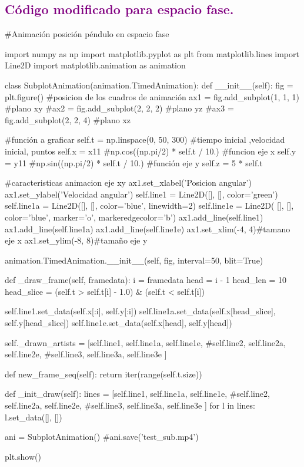 \documentclass[12pt]{article}
\begin{document}
\subsection*{\textcolor{Purple}{Código modificado para espacio fase.}}
\begin{boxedverbatim}
#Animación posición péndulo en espacio fase

import numpy as np
import matplotlib.pyplot as plt
from matplotlib.lines import Line2D
import matplotlib.animation as animation

class SubplotAnimation(animation.TimedAnimation):
    def __init__(self):
        fig = plt.figure()
        #posicion de los cuadros de animación
        ax1 = fig.add_subplot(1, 1, 1) #plano xy
        #ax2 = fig.add_subplot(2, 2, 2) #plano yz
        #ax3 = fig.add_subplot(2, 2, 4) #plano xz

        
        #función a graficar
        self.t = np.linspace(0, 50, 300)
        #tiempo inicial ,velocidad inicial, puntos
        self.x = x11 #np.cos((np.pi/2) * self.t / 10.) #funcion eje x
        self.y = y11 #np.sin((np.pi/2) * self.t / 10.) #función eje y
        self.z = 5 * self.t

        #caracteristicas animacion eje xy
        ax1.set_xlabel('Posicion angular')
        ax1.set_ylabel('Velocidad angular')
        self.line1 = Line2D([], [], color='green')
        self.line1a = Line2D([], [], color='blue', linewidth=2)
        self.line1e = Line2D(
            [], [], color='blue', marker='o', markeredgecolor='b')
        ax1.add_line(self.line1)
        ax1.add_line(self.line1a)
        ax1.add_line(self.line1e)
        ax1.set_xlim(-4, 4)#tamano eje x
        ax1.set_ylim(-8, 8)#tamaño eje y
\end{boxedverbatim}
\pagebreak

\begin{boxedverbatim}    
        animation.TimedAnimation.__init__(self, fig, interval=50, blit=True)

    def _draw_frame(self, framedata):
        i = framedata
        head = i - 1
        head_len = 10
        head_slice = (self.t > self.t[i] - 1.0) & (self.t < self.t[i])

        self.line1.set_data(self.x[:i], self.y[:i])
        self.line1a.set_data(self.x[head_slice], self.y[head_slice])
        self.line1e.set_data(self.x[head], self.y[head])

        self._drawn_artists = [self.line1, self.line1a, self.line1e,
                               #self.line2, self.line2a, self.line2e,
                               #self.line3, self.line3a, self.line3e
                               ]

    def new_frame_seq(self):
        return iter(range(self.t.size))

    def _init_draw(self):
        lines = [self.line1, self.line1a, self.line1e,
                 #self.line2, self.line2a, self.line2e,
                 #self.line3, self.line3a, self.line3e
                 ]
        for l in lines:
            l.set_data([], [])

ani = SubplotAnimation()
#ani.save('test_sub.mp4')

plt.show()
\end{boxedverbatim}
\end{document}
